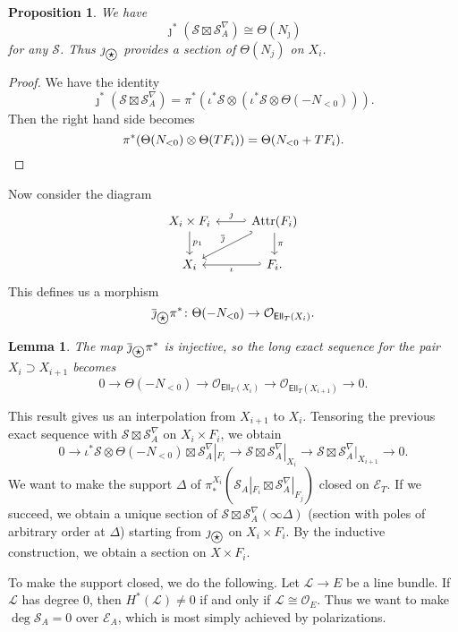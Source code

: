 \documentclass[leqno, openany]{memoir}
\newtheorem{prop}[thm]{Proposition}
\newtheorem{lem}[thm]{Lemma}
\theoremstyle{definition}
\theoremstyle{remark}
\theoremstyle{plain}
\theoremstyle{definition}
\theoremstyle{remark}
\newcommand{\mc}[1]{\mathcal{#1}}
\newcommand{\mr}[1]{\mathrm{#1}}
\newcommand{\ms}[1]{\mathsf{#1}}
\newcommand{\ol}[1]{\overline{#1}}
\newcommand{\ostar}{\stackMath\mathbin{\stackinset{c}{0ex}{c}{0ex}{\star}{\bigcirc}}}
\begin{document}
\begin{prop}
    We have 
    \[ \jmath^* (\mc{S} \boxtimes \mc{S}_A^{\nabla}) \cong \Theta(N_{\jmath}) \]
    for any $\mc{S}$. Thus $\jmath_{\ostar}$ provides a section of $\Theta(N_j)$ on $X_i$.
\end{prop}

\begin{proof}
    We have the identity
    \[ \jmath^* (\mc{S} \boxtimes \mc{S}_A^{\nabla}) = \pi^* (\iota^* \mc{S} \otimes (\iota^* \mc{S} \otimes \Theta(-N_{<0}))). \]
    Then the right hand side becomes
    \[ \pi^* (\Theta(N_{<0}) \otimes \Theta(T F_i)) = \Theta(N_{<0} + T F_i). \qedhere \]
\end{proof}

Now consider the diagram
\begin{equation*}
\begin{tikzcd}
    X_i \times F_i \ar{d}{p_1} \ar[hookleftarrow]{r}{\jmath} & \mr{Attr}(F_i)  \ar{d}{\pi} \\
    X_i \ar[hookleftarrow,swap]{r}{\iota} \ar[hookleftarrow]{ur}{\ol{\jmath}} & F_i.
\end{tikzcd}
\end{equation*}
This defines us a morphism
\[ \ol{\jmath}_{\ostar} \pi^* \colon \Theta(-N_{<0}) \to \mc{O}_{\ms{Ell}_T(X_i)}. \]

\begin{lem}
    The map $\ol{\jmath}_{\ostar} \pi^*$ is injective, so the long exact sequence for the pair $X_i \supset X_{i+1}$ becomes
    \[ 0 \to \Theta(-N_{<0}) \to \mc{O}_{\ms{Ell}_T(X_i)} \to \mc{O}_{\ms{Ell}_T(X_{i+1})} \to 0. \]
\end{lem}

This result gives us an interpolation from $X_{i+1}$ to $X_i$. Tensoring the previous exact sequence with $\mc{S} \boxtimes \mc{S}_A^{\nabla}$ on $X_i \times F_i$, we obtain
\[ 0 \to \iota^* \mc{S} \otimes \Theta(-N_{<0}) \boxtimes \mc{S}_A^{\nabla}|_{F_i} \to \mc{S} \boxtimes \mc{S}_A^{\nabla} |_{X_i} \to \mc{S} \boxtimes \mc{S}_A^{\nabla} |_{X_{i+1}} \to 0. \]
We want to make the support $\Delta$ of $\pi_*^{X_i} (\mc{S}_A |_{F_i} \boxtimes \mc{S}_A^{\nabla} |_{F_j})$ closed on $\mc{E}_T$. If we succeed, we obtain a unique section of $\mc{S} \boxtimes \mc{S}_A^{\nabla} (\infty \Delta)$ (section with poles of arbitrary order at $\Delta$) starting from $\jmath_{\ostar}$ on $X_i \times F_i$. By the inductive construction, we obtain a section on $X \times F_i$.

To make the support closed, we do the following. Let $\mc{L} \to E$ be a line bundle. If $\mc{L}$ has degree $0$, then $H^*(\mc{L}) \neq 0$ if and only if $\mc{L} \cong \mc{O}_E$. Thus we want to make $\deg \mc{S}_A = 0$ over $\mc{E}_A$, which is most simply achieved by polarizations.
\end{document}
